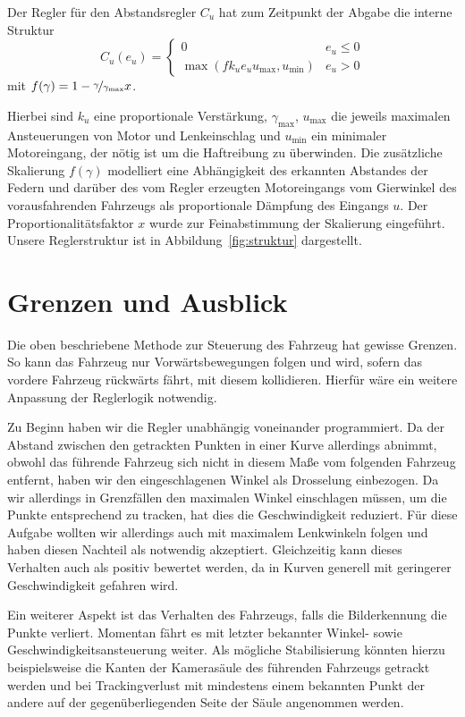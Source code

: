 \documentclass[10pt]{article}
\begin{document}
    Der Regler für den Abstandsregler $C_{u}$ hat zum Zeitpunkt der Abgabe die interne Struktur \[
    C_{u}(e_{u}) = \begin{cases} 0 & e_{u} \leq 0 \\
    \max (fk_{u}e_{u}u_{\max},u_{\min}) &  e_{u} > 0
    \end{cases}
    \]
    mit $f(\gamma) = 1 - \nicefrac{\gamma}{\gamma_{\max}}x$.

    Hierbei sind $k_{u}$ eine proportionale Verstärkung, $\gamma_{\max}$, $u_{\max}$ die jeweils maximalen Ansteuerungen von Motor und Lenkeinschlag und $u_{\min}$ ein minimaler Motoreingang, der nötig ist um die Haftreibung zu überwinden. 
    Die zusätzliche Skalierung $f(\gamma)$ modelliert eine Abhängigkeit des erkannten Abstandes der Federn und darüber des vom Regler erzeugten Motoreingangs vom Gierwinkel des vorausfahrenden Fahrzeugs als proportionale Dämpfung des Eingangs $u$. 
    Der Proportionalitätsfaktor $x$ wurde zur Feinabstimmung der Skalierung eingeführt.
    Unsere Reglerstruktur ist in Abbildung~\ref{fig:struktur} dargestellt.


\section{Grenzen und Ausblick}
    Die oben beschriebene Methode zur Steuerung des Fahrzeug hat gewisse Grenzen.
    So kann das Fahrzeug nur Vorwärtsbewegungen folgen und wird, sofern das vordere Fahrzeug rückwärts fährt, mit diesem kollidieren.
    Hierfür wäre ein weitere Anpassung der Reglerlogik notwendig.

    Zu Beginn haben wir die Regler unabhängig voneinander programmiert.
    Da der Abstand zwischen den getrackten Punkten in einer Kurve allerdings abnimmt, obwohl das führende Fahrzeug sich nicht in diesem Maße vom folgenden Fahrzeug entfernt, haben wir den eingeschlagenen Winkel als Drosselung einbezogen.
    Da wir allerdings in Grenzfällen den maximalen Winkel einschlagen müssen, um die Punkte entsprechend zu tracken, hat dies die Geschwindigkeit reduziert.
    Für diese Aufgabe wollten wir allerdings auch mit maximalem Lenkwinkeln folgen und haben diesen Nachteil als notwendig akzeptiert.
    Gleichzeitig kann dieses Verhalten auch als positiv bewertet werden, da in Kurven generell mit geringerer Geschwindigkeit gefahren wird.

    Ein weiterer Aspekt ist das Verhalten des Fahrzeugs, falls die Bilderkennung die Punkte verliert.
    Momentan fährt es mit letzter bekannter Winkel- sowie Geschwindigkeitsansteuerung weiter.
    Als mögliche Stabilisierung könnten hierzu beispielsweise die Kanten der Kamerasäule des führenden Fahrzeugs getrackt werden und bei Trackingverlust mit mindestens einem bekannten Punkt der andere auf der gegenüberliegenden Seite der Säule angenommen werden.
\end{document}
